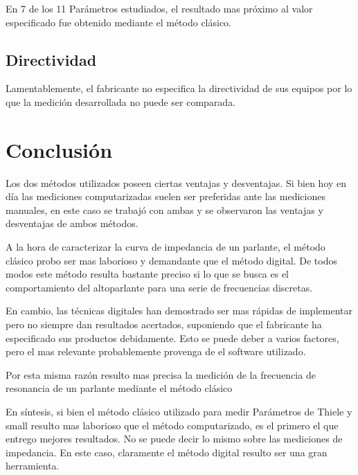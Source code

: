 \documentclass[]{article}
\begin{document}
\begin{multicols}{2}
En 7 de los 11 Parámetros estudiados, el resultado mas próximo al valor especificado
fue obtenido mediante el método clásico.

\subsection{Directividad}
Lamentablemente, el fabricante no especifica la directividad de sus equipos
por lo que la medición desarrollada no puede ser comparada.




\section{Conclusión}
Los dos métodos utilizados poseen ciertas ventajas y desventajas. Si bien hoy en día
las mediciones computarizadas suelen ser preferidas ante las mediciones manuales,
en este caso se trabajó con ambas y se observaron las ventajas y desventajas de
ambos métodos.

A la hora de caracterizar la curva de impedancia de un parlante, el método
clásico probo ser mas laborioso y demandante que el método digital. De todos modos
este método resulta bastante preciso si lo que se busca es el comportamiento del
altoparlante para una serie de frecuencias discretas.

En cambio, las técnicas digitales han demostrado ser mas rápidas de implementar
pero no siempre dan resultados acertados, suponiendo que el fabricante ha especificado
sus productos debidamente. Esto se puede deber a varios factores, pero el mas
relevante probablemente provenga de el software utilizado.

Por esta misma razón resulto mas precisa la medición de la frecuencia de resonancia
de un parlante mediante el método clásico

En síntesis, si bien el método clásico utilizado para medir Parámetros de Thiele y small
resulto mas laborioso que el método computarizado, es el primero el que entrego
mejores resultados. No se puede decir lo mismo sobre las mediciones de impedancia.
En este caso, claramente el método digital resulto ser una gran herramienta.
\printbibliography

\end{multicols}
\end{document}
